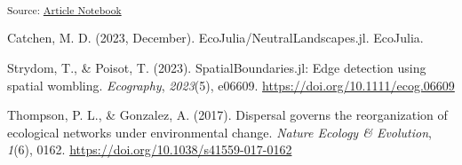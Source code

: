 \documentclass[
]{agujournal2019}
\newlength{\cslhangindent}
\newenvironment{CSLReferences}[2] %
 {\begin{list}{}{%
  \setlength{\itemindent}{0pt}
  \setlength{\leftmargin}{0pt}
  \setlength{\parsep}{0pt}
  \ifodd #1
   \setlength{\leftmargin}{\cslhangindent}
   \setlength{\itemindent}{-1\cslhangindent}
  \fi
  \setlength{\itemsep}{#2\baselineskip}}}
 {\end{list}}
\begin{document}
\textsubscript{Source:
\href{https://PoisotLab.github.io/ms_womble_ya_net/index.qmd.html}{Article
Notebook}}

\label{refs}
\begin{CSLReferences}{1}{0}
Catchen, M. D. (2023, December). {EcoJulia}/{NeutralLandscapes}.jl.
EcoJulia.

Strydom, T., \& Poisot, T. (2023). {SpatialBoundaries}.jl: Edge
detection using spatial wombling. \emph{Ecography}, \emph{2023}(5),
e06609. \url{https://doi.org/10.1111/ecog.06609}

Thompson, P. L., \& Gonzalez, A. (2017). Dispersal governs the
reorganization of ecological networks under environmental change.
\emph{Nature Ecology \& Evolution}, \emph{1}(6), 0162.
\url{https://doi.org/10.1038/s41559-017-0162}

\end{CSLReferences}
\end{document}
